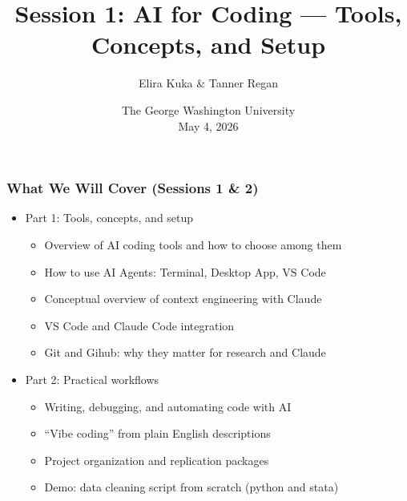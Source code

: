 \documentclass[aspectratio=169, 12pt]{beamer}
\begin{document}
\linespread{1.2}

\title{Session 1: AI for Coding --- Tools, Concepts, and Setup}
\author[AI for Economists]{Elira Kuka \& Tanner Regan}
\date[\today]{The George Washington University \\ May 4, 2026}
\maketitle


\begin{frame}
\frametitle{What We Will Cover (Sessions 1 \& 2)}

\begin{itemize}
    \item Part 1: Tools, concepts, and setup
        \begin{itemize}
            \item[$\circ$] Overview of AI coding tools and how to choose among them
            \item[$\circ$] How to use AI Agents: Terminal, Desktop App, VS Code
            \item[$\circ$] Conceptual overview of context engineering with Claude
            \item[$\circ$] VS Code and Claude Code integration
            \item[$\circ$] Git and Gihub: why they matter for research and Claude
        \end{itemize}
    \vspace{.05in}
    \pause
    \item Part 2: Practical workflows
        \begin{itemize}
            \item[$\circ$] Writing, debugging, and automating code with AI
            \item[$\circ$] ``Vibe coding'' from plain English descriptions
            \item[$\circ$] Project organization and replication packages
            \item[$\circ$] Demo: data cleaning script from scratch (python and stata)
        \end{itemize}
\end{itemize}

\end{frame}
\end{document}
